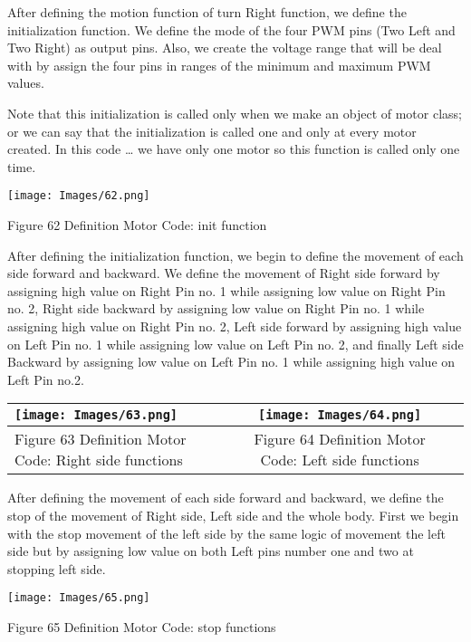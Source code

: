 \documentclass{article}
\begin{document}
After defining the motion function of turn Right function, we define the initialization function. We define the mode of the four PWM pins (Two Left and Two Right) as output pins. Also, we create the voltage range that will be deal with by assign the four pins in ranges of the minimum and maximum PWM values.

Note that this initialization is called only when we make an object of motor class; or we can say that the initialization is called one and only at every motor created.  In this code … we have only one motor so this function is called only one time.

\begin{center}
    \texttt{[image: Images/62.png]}

    Figure 62 Definition Motor Code: init function
\end{center}

After defining the initialization function, we begin to define the movement of each side forward and backward. We define the movement of Right side forward by assigning high value on Right Pin no. 1 while assigning low value on Right Pin no. 2, Right side backward by assigning low value on Right Pin no. 1 while assigning high value on Right Pin no. 2, Left side forward by assigning high value on Left Pin no. 1 while assigning low value on Left Pin no. 2, and finally Left side Backward by assigning low value on Left Pin no. 1 while assigning high value on Left Pin no.2.

\begin{center}
\begin{tabular}{|l|c|r|}
    \hline
    \texttt{[image: Images/63.png]} &  \texttt{[image: Images/64.png]}\\
    \hline
    Figure 63 Definition Motor Code: Right side functions & Figure 64 Definition Motor Code: Left side functions\\
    \hline
\end{tabular}
\end{center}

After defining the movement of each side forward and backward, we define the stop of the movement of Right side, Left side and the whole body. First we begin with the stop movement of the left side by the same logic of movement the left side but by assigning low value on both Left pins number one and two at stopping left side.

\begin{center}
    \texttt{[image: Images/65.png]}

    Figure 65 Definition Motor Code: stop functions
\end{center}
\end{document}
